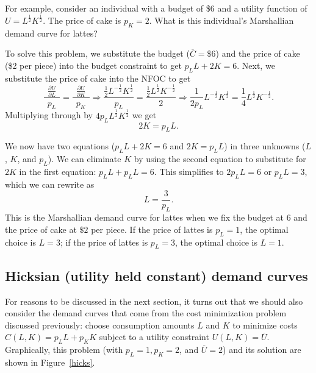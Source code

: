 For example, consider an individual with a budget of \$6 and a utility function of $U=L^{\frac{1}{2}}K^{\frac{1}{2}}$. The price of cake is $p_K=2$. What is this individual's Marshallian demand curve for lattes?

To solve this problem, we substitute the budget ($\overline{C}=\$6$) and the price of cake (\$2 per piece) into the budget constraint to get $p_L L + 2 K=6$. Next, we substitute the price of cake into the NFOC to get
\[
\frac{\ \ \frac{\partial U}{\partial L}\ \ }{p_L}=\frac{\ \
\frac{\partial U}{\partial K}\ \ }{p_K} \Longrightarrow
\frac{\frac{1}{2}L^{-\frac{1}{2}}K^{\frac{1}{2}}}{p_L}=
\frac{\frac{1}{2}L^{\frac{1}{2}}K^{-\frac{1}{2}}}{2}
\Longrightarrow  \frac{1}{2p_L}L^{-\frac{1}{2}}K^{\frac{1}{2}} =
\frac{1}{4}L^{\frac{1}{2}}K^{-\frac{1}{2}}.
\]
Multiplying through by $4p_L L^{\frac{1}{2}}K^{\frac{1}{2}}$ we get
\[
2K=p_L L.
\]

We now have two equations ($p_L L + 2 K=6$ and $2K=p_L L$) in three unknowns ($L$, $K$, and $p_L$). We can eliminate $K$ by using the second equation to substitute for $2K$ in the first equation: $p_L L + p_L L=6$. This simplifies to $2p_L L=6$ or $p_L L=3$, which we can rewrite as
\[
L=\frac{3}{p_L}.
\]
This is the Marshallian demand curve for lattes when we fix the budget at 6 and the price of cake at $\$2$ per piece. If the price of lattes is $p_L=1$, the optimal choice is $L=3$; if the price of lattes is $p_L=3$, the optimal choice is $L=1$.



\subsection*{Hicksian (utility held constant) demand curves}

For reasons to be discussed in the next section, it turns out that we should also consider the demand curves that come from the cost minimization problem discussed previously: choose consumption amounts $L$ and $K$ to minimize costs $C(L, K) = p_L L + p_K K$ subject to a utility constraint $U(L, K)=\overline{U}$. Graphically, this problem (with $p_L=1, p_K=2$, and $\overline{U}=2$) and its solution are shown in Figure~\ref{hicks}.

